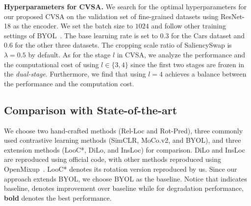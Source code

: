 \textbf{Hyperparameters for CVSA.}\quad
We search for the optimal hyperparameters for our proposed CVSA on the validation set of fine-grained datasets using ResNet-18 as the encoder. We set the batch size to $1024$ and follow other training settings of BYOL~\cite{nips2020byol}. The base learning rate is set to $0.3$ for the Cars dataset and $0.6$ for the other three datasets. The cropping scale ratio of SaliencySwap is $\lambda=0.5$ by default. As for the stage $l$ in CVSA, we analyze the performance and the computational cost of using $l\in \{3,4\}$ since the first two stages are frozen in the \textit{dual-stage}. Furthermore, we find that using $l=4$ achieves a balance between the performance and the computation cost.

\subsection{Comparison with State-of-the-art}
We choose two hand-crafted methods (Rel-Loc and Rot-Pred), three commonly used contrastive learning methods (SimCLR, MoCo.v2, and BYOL), and three extension methods (LooC*, DiLo, and InsLoc) for comparison. DiLo and InsLoc are reproduced using official code, with other methods reproduced using OpenMixup~\cite{li2022openmixup}. LooC* denotes its rotation version reproduced by us. Since our approach extends BYOL, we choose BYOL as the baseline. Notice that  indicates baseline,  denotes improvement over baseline while  for degradation performance, \textbf{bold} denotes the best performance.

